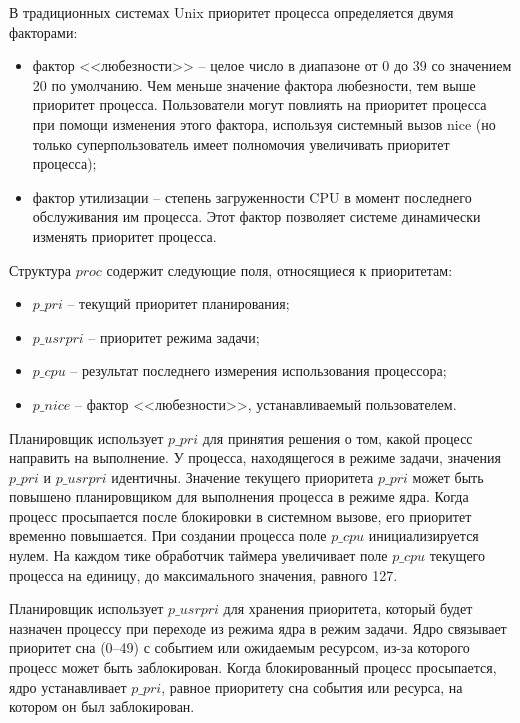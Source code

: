 \documentclass[a4paper, 12pt]{extreport}
\begin{document}
В традиционных системах Unix приоритет процесса определяется двумя факторами: 

\begin{itemize}
	\item фактор <<любезности>> – целое число в диапазоне от 0 до 39 со значением 20 по умолчанию. Чем меньше 
	значение фактора любезности, тем выше приоритет процесса. Пользователи могут повлиять на приоритет процесса при 
	помощи изменения этого фактора, используя системный вызов {\ttfamily nice} (но только суперпользователь имеет 
	полномочия увеличивать приоритет процесса);
	
	\item фактор утилизации -- степень загруженности CPU в момент последнего обслуживания им процесса. Этот фактор 
	позволяет системе динамически изменять приоритет процесса.
\end{itemize}

Структура $proc$ содержит следующие поля, относящиеся к приоритетам:
\begin{itemize}
	\item $p{\_}pri$ -- текущий приоритет планирования;
	\item $p{\_}usrpri$ -- приоритет режима задачи;
	\item $p{\_}cpu$ -- результат последнего измерения использования процессора;
	\item $p{\_}nice$ -- фактор <<любезности>>, устанавливаемый пользователем.
\end{itemize}

Планировщик использует $p\_pri$ для принятия решения о том, какой процесс направить на выполнение. У процесса, 
находящегося в режиме задачи, значения $p\_pri$ и $p\_usrpri$ идентичны. Значение текущего приоритета $p\_pri$ может быть 
повышено планировщиком для выполнения процесса в режиме ядра. Когда процесс просыпается после блокировки в 
системном вызове, его приоритет временно повышается. При создании процесса поле $p\_cpu$ инициализируется нулем. На 
каждом тике обработчик таймера увеличивает поле $p\_cpu$ текущего процесса на единицу, до максимального значения, 
равного 127.

Планировщик использует $p{\_}usrpri$ для хранения приоритета, который будет назначен процессу при переходе из режима 
ядра в режим задачи. Ядро связывает приоритет сна (0--49) с событием или ожидаемым ресурсом, из-за которого процесс 
может быть заблокирован. Когда блокированный процесс просыпается, ядро устанавливает $p{\_}pri$, равное приоритету сна 
события или ресурса, на котором он был заблокирован.
\end{document}
